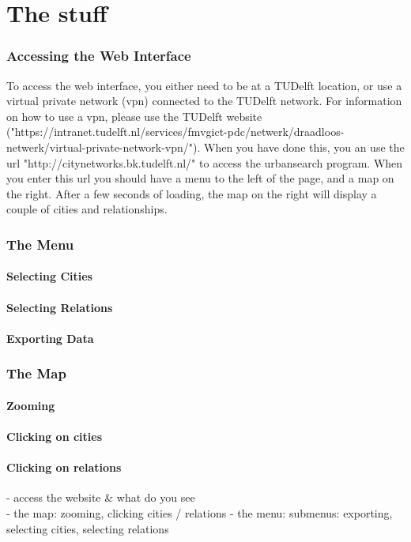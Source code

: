 \chapter{The stuff}

\subsection{Accessing the Web Interface}
To access the web interface, you either need to be at a TUDelft location, or use a virtual private network (vpn) connected to the TUDelft network. For information on how to use a vpn, please use the TUDelft website ("https://intranet.tudelft.nl/services/fmvgict-pdc/netwerk/draadloos-netwerk/virtual-private-network-vpn/"). When you have done this, you an use the url "http://citynetworks.bk.tudelft.nl/" to access the urbansearch program. When you enter this url you should have a menu to the left of the page, and a map on the right. After a few seconds of loading, the map on the right will display a couple of cities and relationships. 


\subsection{The Menu}


\subsubsection{Selecting Cities}
\subsubsection{Selecting Relations}
\subsubsection{Exporting Data}

\subsection{The Map}
\subsubsection{Zooming}
\subsubsection{Clicking on cities}
\subsubsection{Clicking on relations}

- access the website & what do you see \\

- the map: zooming, clicking cities / relations
- the menu: submenus: exporting, selecting cities, selecting relations

